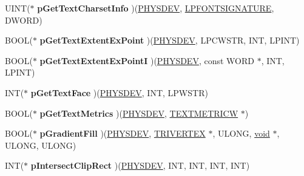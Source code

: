 \begin{DoxyCompactItemize}
\item 
\mbox{\label{structgdi__dc__funcs_a60189ba9672ab901cc88b7b00d126a88}} 
U\+I\+NT($\ast$ {\bfseries p\+Get\+Text\+Charset\+Info} )(\hyperlink{structgdi__physdev}{P\+H\+Y\+S\+D\+EV}, \hyperlink{structtag_f_o_n_t_s_i_g_n_a_t_u_r_e}{L\+P\+F\+O\+N\+T\+S\+I\+G\+N\+A\+T\+U\+RE}, D\+W\+O\+RD)
\item 
\mbox{\label{structgdi__dc__funcs_a7482dd0cdf5f472547675bfb5cab2e1f}} 
B\+O\+OL($\ast$ {\bfseries p\+Get\+Text\+Extent\+Ex\+Point} )(\hyperlink{structgdi__physdev}{P\+H\+Y\+S\+D\+EV}, L\+P\+C\+W\+S\+TR, I\+NT, L\+P\+I\+NT)
\item 
\mbox{\label{structgdi__dc__funcs_aebbb0256bde22a4decb19f9bbaac17ed}} 
B\+O\+OL($\ast$ {\bfseries p\+Get\+Text\+Extent\+Ex\+PointI} )(\hyperlink{structgdi__physdev}{P\+H\+Y\+S\+D\+EV}, const W\+O\+RD $\ast$, I\+NT, L\+P\+I\+NT)
\item 
\mbox{\label{structgdi__dc__funcs_ae7882afcc9c9a716c4644730f927dbdf}} 
I\+NT($\ast$ {\bfseries p\+Get\+Text\+Face} )(\hyperlink{structgdi__physdev}{P\+H\+Y\+S\+D\+EV}, I\+NT, L\+P\+W\+S\+TR)
\item 
\mbox{\label{structgdi__dc__funcs_a337e13e69b476ce69e197c75cc00c14b}} 
B\+O\+OL($\ast$ {\bfseries p\+Get\+Text\+Metrics} )(\hyperlink{structgdi__physdev}{P\+H\+Y\+S\+D\+EV}, \hyperlink{structtag_t_e_x_t_m_e_t_r_i_c_w}{T\+E\+X\+T\+M\+E\+T\+R\+I\+CW} $\ast$)
\item 
\mbox{\label{structgdi__dc__funcs_ac1ad07501136b74b2eb3c1e3b040fe5a}} 
B\+O\+OL($\ast$ {\bfseries p\+Gradient\+Fill} )(\hyperlink{structgdi__physdev}{P\+H\+Y\+S\+D\+EV}, \hyperlink{struct___t_r_i_v_e_r_t_e_x}{T\+R\+I\+V\+E\+R\+T\+EX} $\ast$, U\+L\+O\+NG, \hyperlink{interfacevoid}{void} $\ast$, U\+L\+O\+NG, U\+L\+O\+NG)
\item 
\mbox{\label{structgdi__dc__funcs_a6c433d3e1b86f549fcce20b89a4a1a75}} 
I\+NT($\ast$ {\bfseries p\+Intersect\+Clip\+Rect} )(\hyperlink{structgdi__physdev}{P\+H\+Y\+S\+D\+EV}, I\+NT, I\+NT, I\+NT, I\+NT)
\item 
\mbox{\label{structgdi__dc__funcs_ac3eed9ed5ad93e3024aef0697afda843}} 

\end{DoxyCompactItemize}
